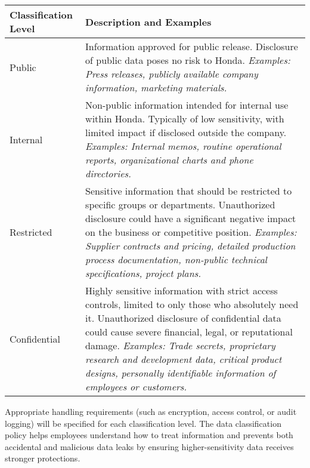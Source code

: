 \begin{center}
\begin{tabular}{|p{}|p{}|}
\hline
\textbf{Classification Level} & \textbf{Description and Examples} \\ \hline
Public & Information approved for public release. Disclosure of public data poses no risk to Honda. \textit{Examples: Press releases, publicly available company information, marketing materials.} \\ \hline
Internal & Non-public information intended for internal use within Honda. Typically of low sensitivity, with limited impact if disclosed outside the company. \textit{Examples: Internal memos, routine operational reports, organizational charts and phone directories.} \\ \hline
Restricted & Sensitive information that should be restricted to specific groups or departments. Unauthorized disclosure could have a significant negative impact on the business or competitive position. \textit{Examples: Supplier contracts and pricing, detailed production process documentation, non-public technical specifications, project plans.} \\ \hline
Confidential & Highly sensitive information with strict access controls, limited to only those who absolutely need it. Unauthorized disclosure of confidential data could cause severe financial, legal, or reputational damage. \textit{Examples: Trade secrets, proprietary research and development data, critical product designs, personally identifiable information of employees or customers.} \\ \hline
\end{tabular}
\end{center}

Appropriate handling requirements (such as encryption, access control, or audit logging) will be specified for each classification level. The data classification policy helps employees understand how to treat information and prevents both accidental and malicious data leaks by ensuring higher-sensitivity data receives stronger protections.

